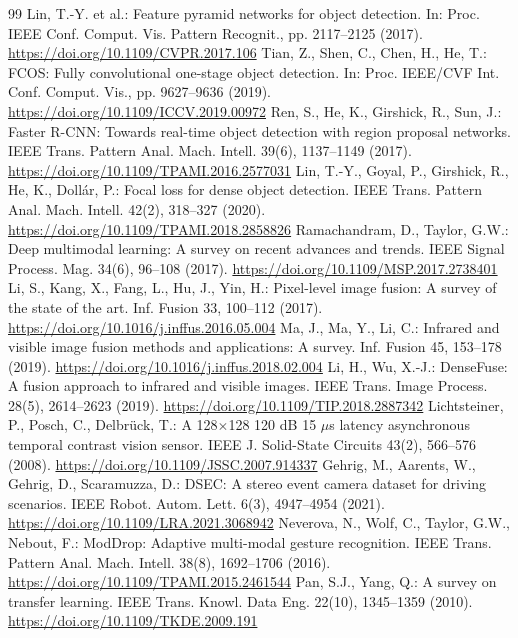 \begin{thebibliography}{99}
 Lin, T.-Y. et al.: Feature pyramid networks for object detection. In: Proc. IEEE Conf. Comput. Vis. Pattern Recognit., pp. 2117--2125 (2017). \url{https://doi.org/10.1109/CVPR.2017.106}
 Tian, Z., Shen, C., Chen, H., He, T.: FCOS: Fully convolutional one-stage object detection. In: Proc. IEEE/CVF Int. Conf. Comput. Vis., pp. 9627--9636 (2019). \url{https://doi.org/10.1109/ICCV.2019.00972}
 Ren, S., He, K., Girshick, R., Sun, J.: Faster R-CNN: Towards real-time object detection with region proposal networks. IEEE Trans. Pattern Anal. Mach. Intell. 39(6), 1137--1149 (2017). \url{https://doi.org/10.1109/TPAMI.2016.2577031}
 Lin, T.-Y., Goyal, P., Girshick, R., He, K., Doll\'{a}r, P.: Focal loss for dense object detection. IEEE Trans. Pattern Anal. Mach. Intell. 42(2), 318--327 (2020). \url{https://doi.org/10.1109/TPAMI.2018.2858826}
 Ramachandram, D., Taylor, G.W.: Deep multimodal learning: A survey on recent advances and trends. IEEE Signal Process. Mag. 34(6), 96--108 (2017). \url{https://doi.org/10.1109/MSP.2017.2738401}
 Li, S., Kang, X., Fang, L., Hu, J., Yin, H.: Pixel-level image fusion: A survey of the state of the art. Inf. Fusion 33, 100--112 (2017). \url{https://doi.org/10.1016/j.inffus.2016.05.004}
 Ma, J., Ma, Y., Li, C.: Infrared and visible image fusion methods and applications: A survey. Inf. Fusion 45, 153--178 (2019). \url{https://doi.org/10.1016/j.inffus.2018.02.004}
 Li, H., Wu, X.-J.: DenseFuse: A fusion approach to infrared and visible images. IEEE Trans. Image Process. 28(5), 2614--2623 (2019). \url{https://doi.org/10.1109/TIP.2018.2887342}
 Lichtsteiner, P., Posch, C., Delbr\"uck, T.: A 128$\times$128 120 dB 15 $\mu$s latency asynchronous temporal contrast vision sensor. IEEE J. Solid-State Circuits 43(2), 566--576 (2008). \url{https://doi.org/10.1109/JSSC.2007.914337}
 Gehrig, M., Aarents, W., Gehrig, D., Scaramuzza, D.: DSEC: A stereo event camera dataset for driving scenarios. IEEE Robot. Autom. Lett. 6(3), 4947--4954 (2021). \url{https://doi.org/10.1109/LRA.2021.3068942}
 Neverova, N., Wolf, C., Taylor, G.W., Nebout, F.: ModDrop: Adaptive multi-modal gesture recognition. IEEE Trans. Pattern Anal. Mach. Intell. 38(8), 1692--1706 (2016). \url{https://doi.org/10.1109/TPAMI.2015.2461544}
 Pan, S.J., Yang, Q.: A survey on transfer learning. IEEE Trans. Knowl. Data Eng. 22(10), 1345--1359 (2010). \url{https://doi.org/10.1109/TKDE.2009.191}

\end{thebibliography}

